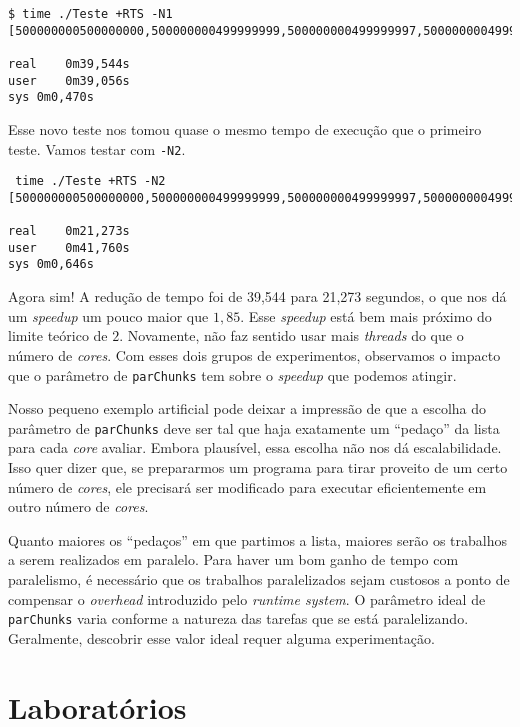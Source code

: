 \documentclass[a4paper]{article}
\begin{document}
\begin{verbatim}
$ time ./Teste +RTS -N1
[500000000500000000,500000000499999999,500000000499999997,500000000499999994]

real	0m39,544s
user	0m39,056s
sys	0m0,470s
\end{verbatim}

Esse novo teste nos tomou quase o mesmo tempo de execução que o primeiro teste.
Vamos testar com \texttt{-N2}.

\begin{verbatim}
 time ./Teste +RTS -N2
[500000000500000000,500000000499999999,500000000499999997,500000000499999994]

real	0m21,273s
user	0m41,760s
sys	0m0,646s
\end{verbatim}

Agora sim!
A redução de tempo foi de 39,544 para 21,273 segundos, o que nos dá um \emph{speedup} um pouco maior que $1,85$.
Esse \emph{speedup} está bem mais próximo do limite teórico de $2$.
Novamente, não faz sentido usar mais \emph{threads} do que o número de \emph{cores}.
Com esses dois grupos de experimentos, observamos o impacto que o parâmetro de \texttt{parChunks} tem sobre o \emph{speedup} que podemos atingir.

Nosso pequeno exemplo artificial pode deixar a impressão de que a escolha do parâmetro de \texttt{parChunks} deve ser tal que haja exatamente um ``pedaço'' da lista para cada \emph{core} avaliar.
Embora plausível, essa escolha não nos dá escalabilidade.
Isso quer dizer que, se prepararmos um programa para tirar proveito de um certo número de \emph{cores}, ele precisará ser modificado para executar eficientemente em outro número de \emph{cores}.

Quanto maiores os ``pedaços'' em que partimos a lista, maiores serão os trabalhos a serem realizados em paralelo.
Para haver um bom ganho de tempo com paralelismo, é necessário que os trabalhos paralelizados sejam custosos a ponto de compensar o \emph{overhead} introduzido pelo \emph{runtime system}.
O parâmetro ideal de \texttt{parChunks} varia conforme a natureza das tarefas que se está paralelizando.
Geralmente, descobrir esse valor ideal requer alguma experimentação.

\pagebreak

\section{Laboratórios}
\end{document}

